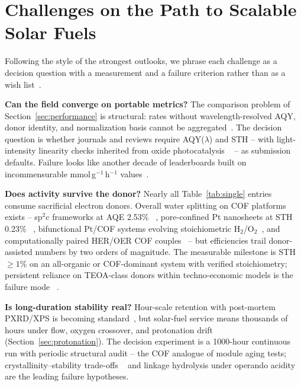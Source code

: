 \section{Challenges on the Path to Scalable Solar Fuels}
\label{sec:challenges}

Following the style of the strongest outlooks, we phrase each challenge as
a decision question with a measurement and a failure criterion rather than
as a wish list~\cite{sun2025design,doremus2024photocatalytic}.

\textbf{Can the field converge on portable metrics?} The comparison
problem of Section~\ref{sec:performance} is structural: rates without
wavelength-resolved AQY, donor identity, and normalization basis cannot be
aggregated~\cite{zhong2023oligo,wang2026bandgap}. The decision question is
whether journals and reviews require AQY($\lambda$) and STH -- with
light-intensity linearity checks inherited from oxide photocatalysis
~\cite{tang2008mechanism} -- as submission defaults. Failure looks like
another decade of leaderboards built on incommensurable
mmol\,g$^{-1}$\,h$^{-1}$ values~\cite{aslam2026a,gu2023recent}.

\textbf{Does activity survive the donor?} Nearly all Table~\ref{tab:single}
entries consume sacrificial electron donors. Overall water splitting on
COF platforms exists -- sp$^2$c frameworks at AQE 2.53\%
~\cite{cheng2023fully}, pore-confined Pt nanosheets at STH 0.23\%
~\cite{yang2023engineering}, bifunctional Pt/COF systems evolving
stoichiometric H$_2$/O$_2$~\cite{zhang2026bifunctional}, and
computationally paired HER/OER COF couples~\cite{wan2020a} -- but
efficiencies trail donor-assisted numbers by two orders of magnitude. The
measurable milestone is STH $\geq 1\%$ on an all-organic or COF-dominant
system with verified stoichiometry; persistent reliance on TEOA-class
donors within techno-economic models is the failure mode
~\cite{chen2026covalent,jia2026rational}.

\textbf{Is long-duration stability real?} Hour-scale retention with
post-mortem PXRD/XPS is becoming standard~\cite{he2023integrated,
lu2024copper}, but solar-fuel service means thousands of hours under
flow, oxygen crossover, and protonation drift
(Section~\ref{sec:protonation}). The decision experiment is a
1000-hour continuous run with periodic structural audit -- the COF
analogue of module aging tests; crystallinity--stability trade-offs
~\cite{ran2024progress,qin2024structural} and linkage hydrolysis under
operando acidity are the leading failure hypotheses.

